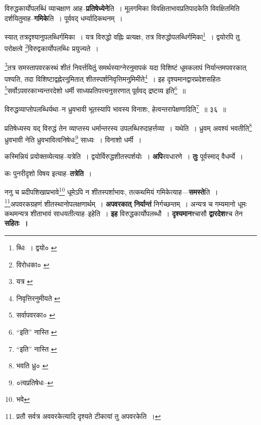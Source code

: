 \documentclass[article,12pt,a4paper]{memoir}
\begin{document}
	  \pstart विरुद्धकार्योपलब्धिं व्याचक्षाण आह--\textbf{प्रतिषेध्येने}ति । मूलगमिका विवक्षिताभावप्रतिपादकेति विवक्षितमिति दर्शयितुमाह--\textbf{गमिके}ति । पूर्ववद् धर्म्यादिकथनम् ।
	\pend
      \leavevmode{}
	  \bigskip
	  \begingroup
	

	  \pstart स्यात् तत्रदृश्यानुपलब्धिर्गमिका । यत्र विरुद्धो वह्निः प्रत्यक्षः, तत्र विरुद्धोपलब्धिर्गमिका\footnote{ब्धिः । द्वयो० \cite{dp-msA} \cite{dp-msB} \cite{dp-edP} \cite{dp-edH} \cite{dp-edE} \cite{dp-edN}} । द्वयोरपि तु परोक्षत्वे \footnote{विरोधका० \cite{dp-msA}}विरुद्वकार्योपलब्धिः प्रयुज्यते ।
	\pend
       

	  \pstart \footnote{यत्र \cite{dp-msA}}तत्र समस्तापवरकस्थं शीतं निवर्त्तयितुं समर्थस्याग्नेरनुमापकं यदा विशिष्टं धूमकलापं निर्यान्तमपवरकात् पश्यति, तदा विशिष्टाद्वह्नेरनुमितात् शीतस्पर्शनिवृत्तिमनुमिमीते\footnote{निवृत्तिरनुमीयते \cite{dp-msA} \cite{dp-msC}} । इह दृश्यमानद्वारप्रदेशसहितः \footnote{सर्वापवरका० \cite{dp-msA} \cite{dp-edP} \cite{dp-edH} \cite{dp-edE} \cite{dp-edN}}सर्वोऽपवरकाभ्यन्तरदेशो धर्मी साध्यप्रतिपत्त्यनुसरणात् पूर्ववद् द्रष्टव्य इति\footnote{“इति” नास्ति \cite{dp-msA} \cite{dp-msB} \cite{dp-msC} \cite{dp-edP} \cite{dp-edH} \cite{dp-edE} \cite{dp-edN}} ॥
	\pend
       
	  \bigskip
	  \begingroup
	

	  \pstart विरुद्धव्याप्तोपलब्धिर्यथा--न ध्रुवभावी भूतस्यापि भावस्य विनाशः, हेत्वन्तरापेक्षणादिति\footnote{“इति” नास्ति \cite{dp-edE}} ॥ ३६ ॥
	\pend
      
	  \endgroup
	 

	  \pstart प्रतिषेध्यस्य यद् विरुद्धं तेन व्याप्तस्य धर्मान्तरस्य उपलब्धिरुदाहर्त्तव्या । यथेति । ध्रुवम् अवश्यं भवतीति\footnote{भवति ध्रु० \cite{dp-msB} \cite{dp-msC} \cite{dp-msD}} ध्रुवभावी नेति ध्रुवभावित्वनिषेधः\footnote{०त्वप्रतिषेधः--\cite{dp-msC}} साध्यः । विनाशो धर्मी ।
	\pend
      
	  \endgroup
	

	  \pstart कस्मिन्नियं प्रयोक्तव्येत्याह--यत्रेति । द्वयोर्विरुद्धशीतस्पर्शयोः । \textbf{अपि}रवधारणे । \textbf{तुः} पूर्वस्माद् वैधर्म्ये ।
	\pend
      

	  \pstart कः पुनरीदृशो विषय इत्याह--\textbf{तत्रेति} ।
	\pend
      

	  \pstart ननु च प्रदीपशिखाप्रभावे\footnote{भवे} धूमेऽपि न शीतस्पर्शाभावः, तत्कथमियं गमिकेत्याह—\textbf{समस्ते}ति । \footnote{प्रतौ सर्वत्र अववरकेत्यादि दृश्यते टीकायां तु अपवरकेति ।}अपवरकग्रहणं शीतस्थानोपलक्षणार्थम् । \textbf{अपवरकात् निर्यान्तं} निर्गच्छन्तम् । अन्यत्र च गम्यमानो धूमः कथमन्यत्र शीताभावं साधयतीत्याह--इहेति । \textbf{इह} विरुद्धकार्योपलब्धौ । \textbf{दृश्यमान}श्चासौ \textbf{द्वारदेश}श्च तेन \textbf{सहितः ।}
	\pend
      
\end{document}

